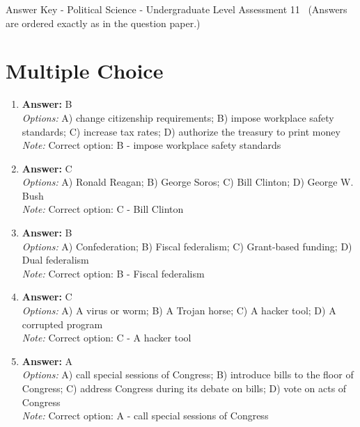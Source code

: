 \documentclass[12pt]{article}
\begin{document}
\begin{center}
Answer Key - Political Science - Undergraduate Level Assessment 11 \
\small (Answers are ordered exactly as in the question paper.)
\end{center}

\section*{Multiple Choice}
\begin{enumerate}[label=\arabic*.]
\item \textbf{Answer:} B
\\ \textit{Options:} A) change citizenship requirements; B) impose workplace safety standards; C) increase tax rates; D) authorize the treasury to print money
\\ \textit{Note:} Correct option: B - impose workplace safety standards
\item \textbf{Answer:} C
\\ \textit{Options:} A) Ronald Reagan; B) George Soros; C) Bill Clinton; D) George W. Bush
\\ \textit{Note:} Correct option: C - Bill Clinton
\item \textbf{Answer:} B
\\ \textit{Options:} A) Confederation; B) Fiscal federalism; C) Grant-based funding; D) Dual federalism
\\ \textit{Note:} Correct option: B - Fiscal federalism
\item \textbf{Answer:} C
\\ \textit{Options:} A) A virus or worm; B) A Trojan horse; C) A hacker tool; D) A corrupted program
\\ \textit{Note:} Correct option: C - A hacker tool
\item \textbf{Answer:} A
\\ \textit{Options:} A) call special sessions of Congress; B) introduce bills to the floor of Congress; C) address Congress during its debate on bills; D) vote on acts of Congress
\\ \textit{Note:} Correct option: A - call special sessions of Congress
\end{enumerate}
\end{document}

